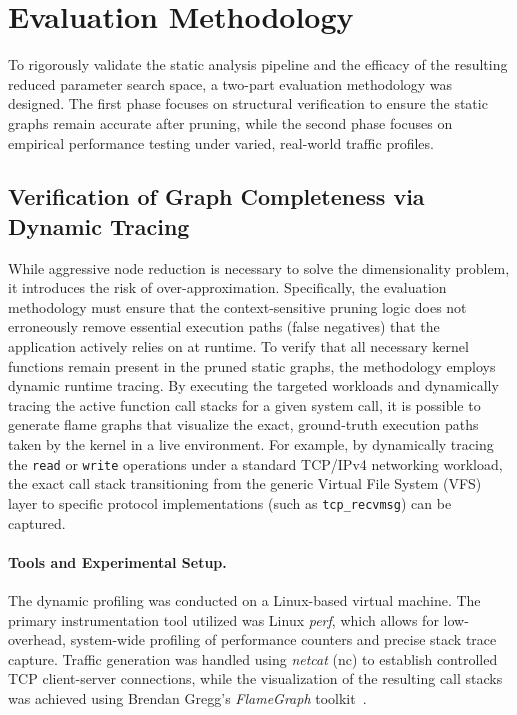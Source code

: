 \section{Evaluation Methodology}

To rigorously validate the static analysis pipeline and the efficacy of the resulting reduced parameter search space, a two-part evaluation methodology was designed.
The first phase focuses on structural verification to ensure the static graphs remain accurate after pruning, while the second phase focuses on empirical performance testing under varied, real-world traffic profiles.

\subsection{Verification of Graph Completeness via Dynamic Tracing} \label{subsec:methodology_dynamic_tracing}

While aggressive node reduction is necessary to solve the dimensionality problem, it introduces the risk of over-approximation.
Specifically, the evaluation methodology must ensure that the context-sensitive pruning logic does not erroneously remove essential execution paths (false negatives) that the application actively relies on at runtime.
To verify that all necessary kernel functions remain present in the pruned static graphs, the methodology employs dynamic runtime tracing.
By executing the targeted workloads and dynamically tracing the active function call stacks for a given system call, it is possible to generate flame graphs that visualize the exact, ground-truth execution paths taken by the kernel in a live environment.
For example, by dynamically tracing the \texttt{read} or \texttt{write} operations under a standard TCP/IPv4 networking workload, the exact call stack transitioning from the generic Virtual File System (VFS) layer to specific protocol implementations (such as \texttt{tcp\_recvmsg}) can be captured.

\paragraph{Tools and Experimental Setup.}
The dynamic profiling was conducted on a Linux-based virtual machine.
The primary instrumentation tool utilized was Linux \textit{perf}, which allows for low-overhead, system-wide profiling of performance counters and precise stack trace capture.
Traffic generation was handled using \textit{netcat} (nc) to establish controlled TCP client-server connections, while the visualization of the resulting call stacks was achieved using Brendan Gregg’s \textit{FlameGraph} toolkit~\cite{flame_graphs}.

